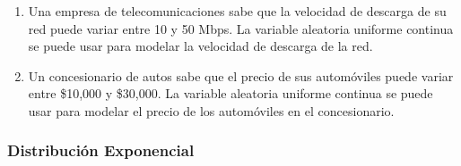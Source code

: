 \begin{Ejer}
\begin{enumerate}
    \item Una empresa de telecomunicaciones sabe que la velocidad de descarga de su red puede variar entre 10 y 50 Mbps. La variable aleatoria uniforme continua se puede usar para modelar la velocidad de descarga de la red.

    \item Un concesionario de autos sabe que el precio de sus automóviles puede variar entre \$10,000 y \$30,000. La variable aleatoria uniforme continua se puede usar para modelar el precio de los automóviles en el concesionario.
\end{enumerate}

\end{Ejer}

\subsubsection{Distribución Exponencial}
